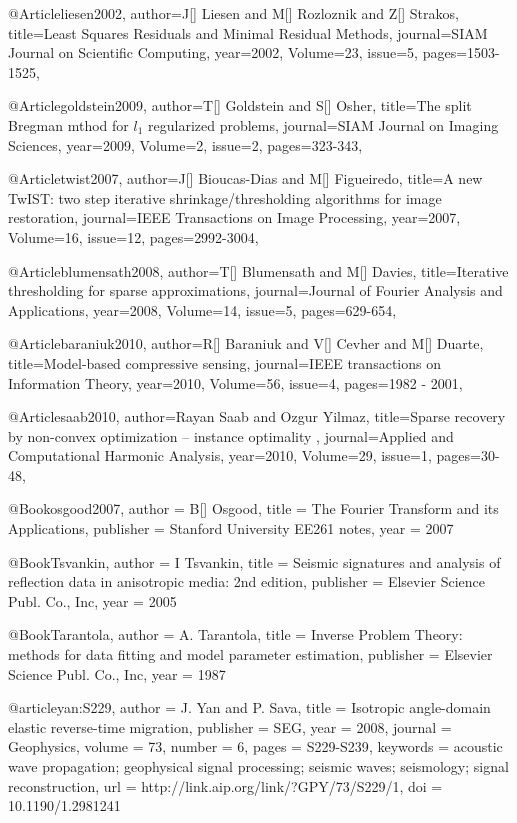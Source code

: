 @Article{liesen2002,
  author={J[] Liesen and M[] Rozloznik and Z[] Strakos},
  title={Least Squares Residuals and Minimal Residual Methods},
  journal={SIAM Journal on Scientific Computing},
  year=2002,
  Volume=23,
  issue=5,
  pages={1503-1525},
}

@Article{goldstein2009,
  author={T[] Goldstein and S[] Osher},
  title={The split Bregman mthod for $l_1$ regularized problems},
  journal={SIAM Journal on Imaging Sciences},
  year=2009,
  Volume=2,
  issue=2,
  pages={323-343},
}



@Article{twist2007,
  author={J[] Bioucas-Dias and M[] Figueiredo},
  title={A new TwIST: two step iterative shrinkage/thresholding algorithms for image restoration},
  journal={IEEE Transactions on Image Processing},
  year=2007,
  Volume=16,
  issue=12,
  pages={2992-3004},
}

@Article{blumensath2008,
  author={T[] Blumensath and M[] Davies},
  title={Iterative thresholding for sparse approximations},
  journal={Journal of {F}ourier Analysis and Applications},
  year=2008,
  Volume=14,
  issue=5,
  pages={629-654},
}

@Article{baraniuk2010,
  author={R[] Baraniuk and V[] Cevher and M[] Duarte},
  title={Model-based compressive sensing},
  journal={IEEE transactions on Information Theory},
  year=2010,
  Volume=56,
  issue=4,
  pages={1982 - 2001},
}

@Article{saab2010,
  author={Rayan Saab and Ozgur Yilmaz},
  title={Sparse recovery by non-convex optimization – instance optimality },
  journal={Applied and Computational Harmonic Analysis},
  year=2010,
  Volume=29,
  issue=1,
  pages={30-48},
}

@Book{osgood2007,
  author =	 {B[] Osgood},
  title =	 {The {F}ourier Transform and its Applications},
  publisher =	 {Stanford University EE261 notes},
  year =	 2007
}

@Book{Tsvankin,
  author =	 {I Tsvankin},
  title =	 {Seismic signatures and analysis of reflection data
                  in anisotropic media: 2nd edition},
  publisher =	 {Elsevier Science Publ. Co., Inc},
  year =	 2005
}

@Book{Tarantola,
  author = 	 {A. Tarantola},
  title = 	 {Inverse {P}roblem {T}heory: methods for data
                 fitting and model parameter estimation},
  publisher = 	 {Elsevier Science Publ. Co., Inc},
  year = 	 1987
}

@article{yan:S229,
  author =	 {J. Yan and P. Sava},
  title =	 {Isotropic angle-domain elastic reverse-time
                  migration},
  publisher =	 {SEG},
  year =	 2008,
  journal =	 {Geophysics},
  volume =	 73,
  number =	 6,
  pages =	 {S229-S239},
  keywords =	 {acoustic wave propagation; geophysical signal
                  processing; seismic waves; seismology; signal
                  reconstruction},
  url =		 {http://link.aip.org/link/?GPY/73/S229/1},
  doi =		 {10.1190/1.2981241}
}


